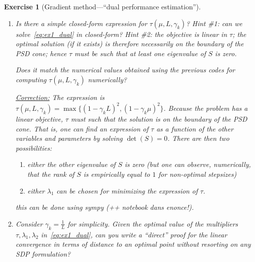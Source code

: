 \documentclass[11pt,a4paper]{article}
\newcommand{\correction}[1]{{{\color{blue}\underline{Correction:} #1}}}
\newcommand{\correction}[1]{}
\newtheorem{exercise}{Exercise}
\begin{document}
\begin{exercise}[Gradient method---``dual performance estimation'']
\begin{enumerate}
	\correction{As $\tau(\mu,L,\gamma_k)$ corresponds to the feasible point with the smallest value of $\tau$, all feasible points to the dual problem are upper bounds on $\tau(\mu,L,\gamma_k)$. That is, any feasible point $(\tau,\lambda_1,\lambda_2)$ satisfy to $\tau(\mu,L,\gamma_k)\leqslant \tau$.}
	
	\item Is there a simple closed-form expression for $\tau(\mu,L,\gamma_k)$? Hint \#1: can we solve~\eqref{eq:ex1_dual} in closed-form? Hint \#2: the objective is linear in $\tau$; the optimal solution (if it exists) is therefore necessarily on the boundary of the PSD cone; hence $\tau$ must be such that at least one eigenvalue of $S$ is zero.
	
	Does it match the numerical values obtained using the previous codes for computing $\tau(\mu,L,\gamma_k)$ numerically?
	
	\correction{The expression is $\tau(\mu,L,\gamma_k)=\max\{(1-\gamma_k L)^2,(1-\gamma_k\mu)^2\}$. Because the problem has a linear objective, $\tau$ must such that the solution is on the boundary of the PSD cone. That is, one can find an expression of $\tau$ as a function of the other variables and parameters by solving $\det(S)=0$. There are then two possibilities:
	\begin{enumerate}
	\item either the other eigenvalue of $S$ is zero (but one can observe, numerically, that the rank of $S$ is empirically equal to $1$ for non-optimal stepsizes)
	\item either $\lambda_1$ can be chosen for minimizing the expression of $\tau$.
	\end{enumerate} this can be done using sympy (++ notebook dans enonce!).}
	
	\item Consider $\gamma_k=\frac{1}{L}$ for simplicity. Given the optimal value of the multipliers $\tau,\lambda_1,\lambda_2$ in~\eqref{eq:ex1_dual}, can you write a ``direct'' proof for the linear convergence in terms of distance to an optimal point without resorting on any SDP formulation?
	

\end{enumerate}
\end{exercise}
\end{document}
